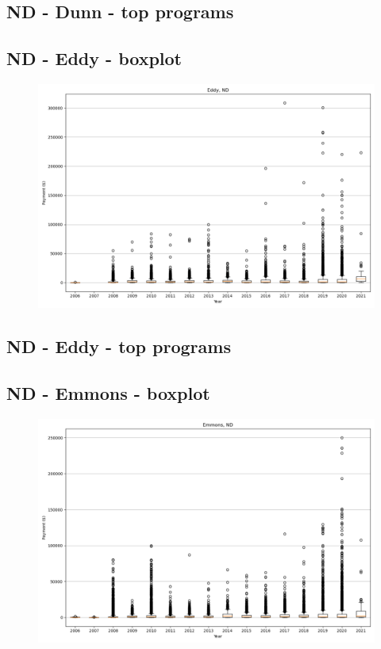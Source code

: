 \subsection*{ND - Dunn - top programs}

\newpage
\subsection*{ND - Eddy - boxplot}
\begin{figure}[h]
\centering
\includegraphics[width=7in]{../output/boxplots/counties/Eddy-ND_boxplot.png}
\end{figure}


\subsection*{ND - Eddy - top programs}

\newpage
\subsection*{ND - Emmons - boxplot}
\begin{figure}[h]
\centering
\includegraphics[width=7in]{../output/boxplots/counties/Emmons-ND_boxplot.png}
\end{figure}


